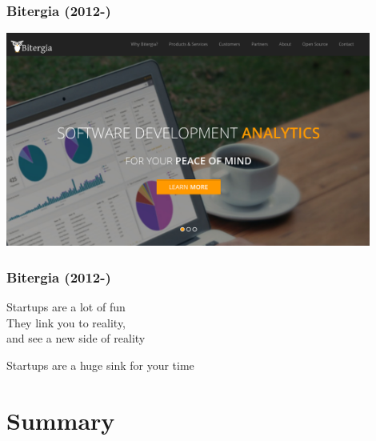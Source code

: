 \documentclass[17pt,aspectratio=169,hyperref=pdfusetitle]{beamer}
\begin{document}
\begin{frame}[fragile]
  \frametitle{Bitergia (2012-)}

  \begin{center}
  \includegraphics[width=12cm]{figs/bitergia}
  \end{center}  
  
\end{frame}

\begin{frame}[fragile]
  \frametitle{Bitergia (2012-)}

  Startups are a lot of fun \\
  They link you to reality, \\
  and see a new side of reality \\
  
  \begin{center}
    Startups are a huge sink for your time
  \end{center}  
  
\end{frame}

\section{Summary}
\end{document}
